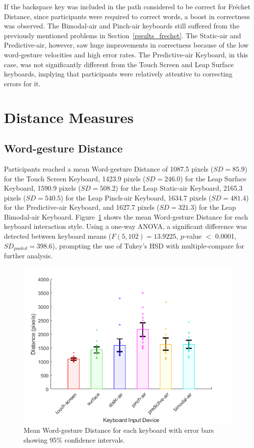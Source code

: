 If the backspace key was included in the path considered to be correct for Fr\'echet Distance, since participants were required to correct words, a boost in correctness was observed. The Bimodal-air and Pinch-air keyboards still suffered from the previously mentioned problems in Section~\ref{results_frechet}. The Static-air and Predictive-air, however, saw huge improvements in correctness because of the low word-gesture velocities and high error rates. The Predictive-air Keyboard, in this case, was not significantly different from the Touch Screen and Leap Surface keyboards, implying that participants were relatively attentive to correcting errors for it.

\section{Distance Measures}
\subsection{Word-gesture Distance} \label{results_distance}
Participants reached a mean Word-gesture Distance of 1087.5 pixels ($SD = 85.9$) for the Touch Screen Keyboard, 1423.9 pixels ($SD = 246.0$) for the Leap Surface Keyboard, 1590.9 pixels ($SD = 508.2$) for the Leap Static-air Keyboard, 2165.3 pixels ($SD = 540.5$) for the Leap Pinch-air Keyboard, 1634.7 pixels ($SD = 481.4$) for the Predictive-air Keyboard, and 1627.7 pixels ($SD = 321.3$) for the Leap Bimodal-air Keyboard. Figure~\ref{fig_distance_mean} shows the mean Word-gesture Distance for each keyboard interaction style. Using a one-way ANOVA, a significant difference was detected between keyboard means ($F(5, 102) = 13.9225$, $p$-value $<$ 0.0001, $SD_{pooled} = 398.6$), prompting the use of Tukey's HSD with multiple-compare for further analysis.

\begin{figure}[!t]
	\centering
	\includegraphics{Figures/fig_distance_mean}
	\caption[Mean Word-gesture Distance]{Mean Word-gesture Distance for each keyboard with error bars showing 95\% confidence intervals.}
	\label{fig_distance_mean}
\end{figure}

